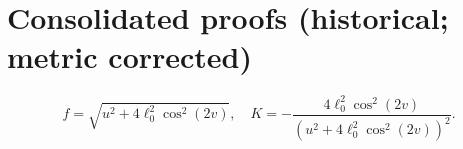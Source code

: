 \documentclass[11pt]{article}
\begin{document}
\section*{Consolidated proofs (historical; metric corrected)}
\[
f=\sqrt{u^2+4\ell_0^2\cos^2(2v)},\quad
K=-\frac{4\ell_0^2\cos^2(2v)}{(u^2+4\ell_0^2\cos^2(2v))^2}.
\]
\end{document}
